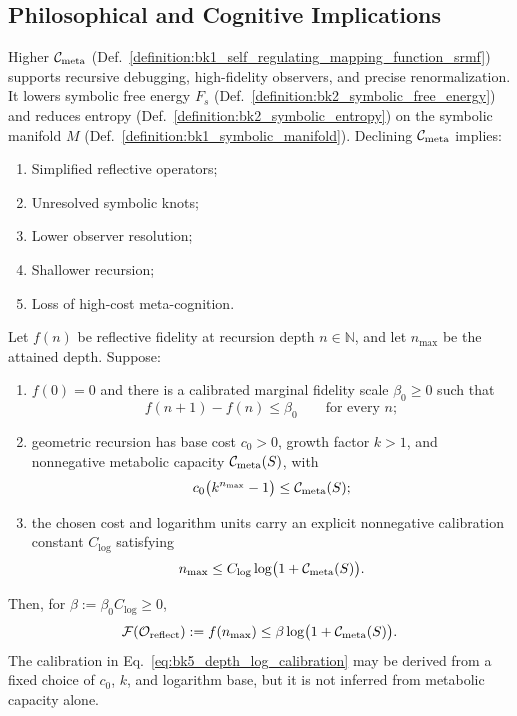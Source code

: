 \subsection{Philosophical and Cognitive Implications}
\label{subsec:bk5_philosophical_and_cognitive_implications}
\begin{scholium} \label{scholium:bk5_metabolic_cost_of_cognition}
Higher $\mathcal{C}_{\text{meta}}$ (Def.~\ref{definition:bk1_self_regulating_mapping_function_srmf})
supports recursive debugging, high-fidelity observers, and precise
renormalization. It lowers symbolic free energy $F_s$
(Def.~\ref{definition:bk2_symbolic_free_energy}) and reduces entropy
(Def.~\ref{definition:bk2_symbolic_entropy}) on the symbolic manifold $M$
(Def.~\ref{definition:bk1_symbolic_manifold}).
Declining $\mathcal{C}_{\text{meta}}$ implies:
\begin{enumerate}
    \item Simplified reflective operators;
    \item Unresolved symbolic knots;
    \item Lower observer resolution;
    \item Shallower recursion;
    \item Loss of high-cost meta-cognition.
\end{enumerate}
\end{scholium}
\begin{theorem} \label{theorem:bk5_metabolic_constraints_reflective_accuracy}
Let $f(n)$ be reflective fidelity at recursion depth $n\in\mathbb{N}$, and
let $n_{\max}$ be the attained depth.  Suppose:
\begin{enumerate}
\item $f(0)=0$ and there is a calibrated marginal fidelity scale
$\beta_0\geq0$ such that
\begin{equation}
 f(n+1)-f(n)\leq\beta_0\qquad\text{for every }n;
 \label{eq:bk5_marginal_fidelity_bound}
\end{equation}
\item geometric recursion has base cost $c_0>0$, growth factor $k>1$, and
nonnegative metabolic capacity $\mathcal{C}_{\text{meta}}(S)$, with
\begin{equation}
 c_0\bigl(k^{n_{\max}}-1\bigr)\leq\mathcal{C}_{\text{meta}}(S);
 \label{eq:bk5_accuracy_geometric_budget}
\end{equation}
\item the chosen cost and logarithm units carry an explicit nonnegative
calibration constant $C_{\log}$ satisfying
\begin{equation}
 n_{\max}\leq C_{\log}\log\bigl(1+\mathcal{C}_{\text{meta}}(S)\bigr).
 \label{eq:bk5_depth_log_calibration}
\end{equation}
\end{enumerate}
Then, for $\beta:=\beta_0C_{\log}\geq0$,
\begin{equation}
 \mathcal{F}(\mathcal{O}_{\mathrm{reflect}}):=f(n_{\max})
 \leq\beta\log\bigl(1+\mathcal{C}_{\text{meta}}(S)\bigr).
 \label{eq:bk5_reflective_accuracy_envelope}
\end{equation}
The calibration in Eq.~\eqref{eq:bk5_depth_log_calibration} may be derived
from a fixed choice of $c_0$, $k$, and logarithm base, but it is not inferred
from metabolic capacity alone.
\end{theorem}
